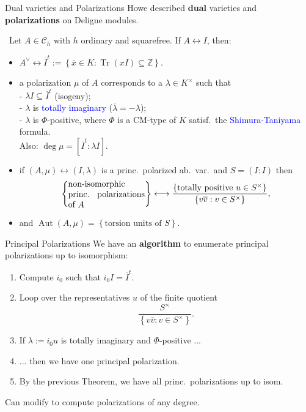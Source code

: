 \documentclass[usenames,dvipsnames,handout]{beamer}
\def\Z{\mathbb{Z}}
\DeclareMathOperator{\Aut}{Aut}
\DeclareMathOperator{\Tr}{Tr}
\newcommand{\cC}{{\mathcal C}}
\newcommand{\set}[1]{\left\lbrace#1\right\rbrace }
\newcommand{\blue}[1]{\textcolor{blue}{#1}}
\begin{document}
\begin{frame}{Dual varieties and Polarizations }
    Howe described \textbf{dual} varieties and \textbf{polarizations} on Deligne modules.
\pause
    \begin{theorem}\
    Let $A\in \cC_h$ with $h$ ordinary and squarefree. If $A\leftrightarrow I$, then:
    \begin{itemize}
\pause
    \item $A^\vee \leftrightarrow \overline{I}^t:=\set{ \overline{x} \in K : \Tr(xI)\subseteq \Z}$.
\pause
    \item a polarization $\mu$ of $A$ corresponds to a $\lambda\in K^\times$ such that\\
    - $\lambda I \subseteq \overline{I}^t$ (isogeny);\\
    - $\lambda$ is \blue{totally imaginary} ($\overline \lambda = -\lambda$);\\
    - $\lambda$ is $\Phi$-positive, where $\Phi$ is a CM-type of $K$ satisf.~the \blue{Shimura-Taniyama} formula.\\ 
\pause
    Also: $\deg \mu= [\overline{I}^t : \lambda I]$.
\pause
    \item if $(A,\mu) \leftrightarrow (I,\lambda)$ is a princ.~polarized ab.~var.~and $S=(I:I)$ then
    \vspace{-0.7em}
    \[\set{\parbox[p]{9em}{non-isomorphic princ. polarizations of $A$}} \longleftrightarrow \dfrac{\set{\text{totally positive }u\in S^\times }}{\set{v\overline{v}: v\in S^\times}},\]
    \vspace{-1.5em}
\pause
    \item  and $\Aut(A,\mu) = \set{\text{torsion units of $S$}}$.
    \end{itemize}
    \end{theorem}
\end{frame}


\begin{frame}{Principal Polarizations}
    We have an {\bf algorithm} to enumerate principal polarizations up to isomorphism:
\pause
    \begin{enumerate}
    \item Compute $i_0$ such that $i_0 I = \overline{I}^t$.
\pause
    \item Loop over the representatives $u$ of the finite quotient
    \[ \frac{S^\times}{\set{v\overline{v}: v\in S^\times}}. \]
\pause    
    \item If $\lambda:=i_0 u$ is totally imaginary and $\Phi$-positive ...
\pause    
    \item ... then we have one principal polarization.
\pause    
    \item By the previous Theorem, we have all princ.~polarizations up to isom.
    \end{enumerate}
\pause 
    Can modify to compute polarizations of any degree.
\end{frame}
\end{document}
